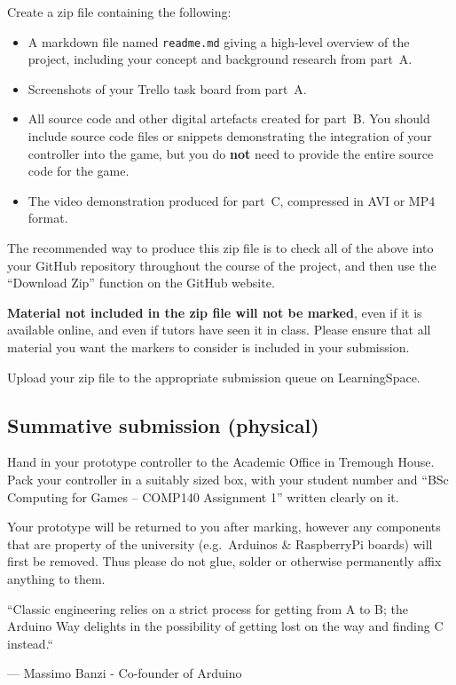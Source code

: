 \documentclass{../fal_assignment}
\begin{document}
Create a zip file containing the following:

\begin{itemize}
\item A markdown file named \texttt{readme.md} giving a high-level overview of the project,
    including your concept and background research from part~A.
\item Screenshots of your Trello task board from part~A.
\item All source code and other digital artefacts created for part~B.
    You should include source code files or snippets demonstrating the integration of your controller into the game,
    but you do \textbf{not} need to provide the entire source code for the game.
\item The video demonstration produced for part~C, compressed in AVI or MP4 format.
\end{itemize}

The recommended way to produce this zip file is to check all of the above into your GitHub repository
throughout the course of the project,
and then use the ``Download Zip'' function on the GitHub website.

\textbf{Material not included in the zip file will not be marked},
even if it is available online, and even if tutors have seen it in class.
Please ensure that all material you want the markers to consider is included in your submission.

Upload your zip file to the appropriate submission queue on LearningSpace.

\subsection*{Summative submission (physical)}

Hand in your prototype controller to the Academic Office in Tremough House.
Pack your controller in a suitably sized box, with your student number
and ``BSc Computing for Games -- COMP140 Assignment 1'' written clearly on it.

Your prototype will be returned to you after marking,
however any components that are property of the university (e.g.\ Arduinos \& RaspberryPi boards)
will first be removed.
Thus please do not glue, solder or otherwise permanently affix anything to them.

\begin{marginquote}
    ``Classic engineering relies on a strict process for getting from A to B; the Arduino Way delights in the possibility of getting lost on the way and finding C instead.``
    
   
    --- Massimo Banzi - Co-founder of Arduino
\end{marginquote}
\end{document}
